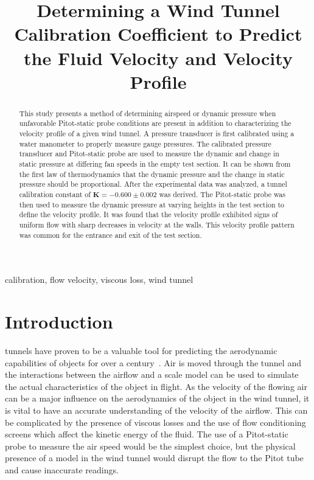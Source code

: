 \documentclass[journal,letterpaper]{IEEEtran}
\begin{document}
\title{Determining a Wind Tunnel Calibration Coefficient to Predict the Fluid Velocity and Velocity Profile}

\author{
}

\maketitle
\thispagestyle{empty}

\begin{abstract}
This study presents a method of determining airspeed or dynamic pressure when unfavorable Pitot-static probe conditions are present in addition to characterizing the velocity profile of a given wind tunnel.
A pressure transducer is first calibrated using a water manometer to properly measure gauge pressures.
The calibrated pressure transducer and Pitot-static probe are used to measure the dynamic and change in static pressure at differing fan speeds in the empty test section.
It can be shown from the first law of thermodynamics that the dynamic pressure and the change in static pressure should be proportional.
After the experimental data was analyzed, a tunnel calibration constant of $\bm{K = -0.600 \pm 0.002}$ was derived.
The Pitot-static probe was then used to measure the dynamic pressure at varying heights in the test section to define the velocity profile.
It was found that the velocity profile exhibited signs of uniform flow with sharp decreases in velocity at the walls.
This velocity profile pattern was common for the entrance and exit of the test section.
\end{abstract}

\begin{IEEEkeywords}
calibration, flow velocity, viscous loss, wind tunnel
\end{IEEEkeywords}


\section{Introduction}


 tunnels have proven to be a valuable tool for predicting the aerodynamic capabilities of objects for over a century~\cite{lecture}.
Air is moved through the tunnel and the interactions between the airflow and a scale model can be used to simulate the actual characteristics of the object in flight.
As the velocity of the flowing air can be a major influence on the aerodynamics of the object in the wind tunnel, it is vital to have an accurate understanding of the velocity of the airflow.
This can be complicated by the presence of viscous losses and the use of flow conditioning screens which affect the kinetic energy of the fluid.
The use of a Pitot-static probe to measure the air speed would be the simplest choice, but the physical presence of a model in the wind tunnel would disrupt the flow to the Pitot tube and cause inaccurate readings.
\end{document}
